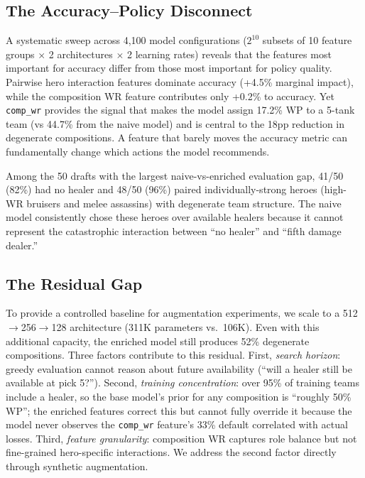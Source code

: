 \documentclass[conference]{IEEEtran}
\begin{document}
\subsection{The Accuracy--Policy Disconnect}

A systematic sweep across 4,100 model configurations ($2^{10}$ subsets of 10 feature groups $\times$ 2 architectures $\times$ 2 learning rates) reveals that the features most important for accuracy differ from those most important for policy quality. Pairwise hero interaction features dominate accuracy (+4.5\% marginal impact), while the composition WR feature contributes only +0.2\% to accuracy. Yet \texttt{comp\_wr} provides the signal that makes the model assign 17.2\% WP to a 5-tank team (vs 44.7\% from the naive model) and is central to the 18pp reduction in degenerate compositions. A feature that barely moves the accuracy metric can fundamentally change which actions the model recommends.

Among the 50 drafts with the largest naive-vs-enriched evaluation gap, 41/50 (82\%) had no healer and 48/50 (96\%) paired individually-strong heroes (high-WR bruisers and melee assassins) with degenerate team structure. The naive model consistently chose these heroes over available healers because it cannot represent the catastrophic interaction between ``no healer'' and ``fifth damage dealer.''

\subsection{The Residual Gap}

To provide a controlled baseline for augmentation experiments, we scale to a 512$\to$256$\to$128 architecture (311K parameters vs.\ 106K). Even with this additional capacity, the enriched model still produces 52\% degenerate compositions. Three factors contribute to this residual. First, \textit{search horizon}: greedy evaluation cannot reason about future availability (``will a healer still be available at pick 5?''). Second, \textit{training concentration}: over 95\% of training teams include a healer, so the base model's prior for any composition is ``roughly 50\% WP''; the enriched features correct this but cannot fully override it because the model never observes the \texttt{comp\_wr} feature's 33\% default correlated with actual losses. Third, \textit{feature granularity}: composition WR captures role balance but not fine-grained hero-specific interactions. We address the second factor directly through synthetic augmentation.
\end{document}
